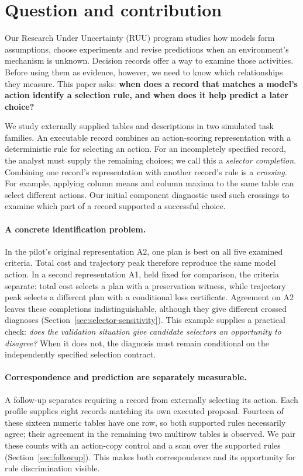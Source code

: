 \section{Question and contribution}
Our Research Under Uncertainty (RUU) program studies how models form assumptions, choose
experiments and revise predictions when an environment's mechanism is unknown.
Decision records offer a way to examine those activities. Before using them
as evidence, however, we need to know which relationships they measure.
This paper asks: \textbf{when does a record that matches a model's action
identify a selection rule, and when does it help predict a later choice?}

We study externally supplied tables and descriptions in two simulated task
families. An executable record combines an action-scoring representation
with a deterministic rule for selecting an action. For an incompletely
specified record, the analyst must supply the remaining choices; we call
this a \emph{selector completion}. Combining one record's representation
with another record's rule is a \emph{crossing}. For example, applying
column means and column maxima to the same table can select different
actions. Our initial component diagnostic used such crossings to examine
which part of a record supported a successful choice.

\paragraph{A concrete identification problem.}
In the pilot's original representation A2, one plan is best on all five
examined criteria. Total cost and trajectory peak therefore reproduce the
same model action. In a second representation A1, held fixed for comparison,
the criteria separate: total cost selects a plan with a preservation witness,
while trajectory peak selects a different plan with a conditional loss
certificate. Agreement on A2 leaves these completions indistinguishable,
although they give different crossed diagnoses
(Section~\ref{sec:selector-sensitivity}). This example supplies a practical
check: \emph{does the validation situation give candidate selectors an
opportunity to disagree?} When it does not, the diagnosis must remain
conditional on the independently specified selection contract.

\paragraph{Correspondence and prediction are separately measurable.}
A follow-up separates requiring a record from externally selecting its
action. Each profile supplies eight records matching its own executed
proposal. Fourteen of these sixteen numeric tables have one row, so both
supported rules necessarily agree; their agreement in the remaining two
multirow tables is observed. We pair these counts with an action-copy control
and a scan over the supported rules (Section~\ref{sec:followup}). This makes
both correspondence and its opportunity for rule discrimination visible.

